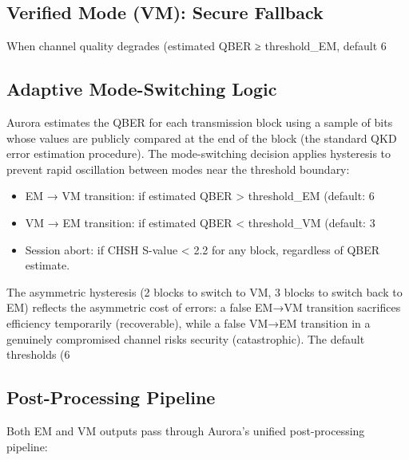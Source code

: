 \subsection{Verified Mode (VM): Secure Fallback}
When channel quality degrades (estimated QBER ≥ threshold_EM, default 6%

\subsection{Adaptive Mode-Switching Logic}
Aurora estimates the QBER for each transmission block using a sample of bits whose values are publicly compared at the end of the block (the standard QKD error estimation procedure). The mode-switching decision applies hysteresis to prevent rapid oscillation between modes near the threshold boundary:

\begin{itemize}
\item EM → VM transition: if estimated QBER > threshold_EM (default: 6%
\item VM → EM transition: if estimated QBER < threshold_VM (default: 3%
\item Session abort: if CHSH S-value < 2.2 for any block, regardless of QBER estimate.
\end{itemize}


The asymmetric hysteresis (2 blocks to switch to VM, 3 blocks to switch back to EM) reflects the asymmetric cost of errors: a false EM→VM transition sacrifices efficiency temporarily (recoverable), while a false VM→EM transition in a genuinely compromised channel risks security (catastrophic). The default thresholds (6%

\subsection{Post-Processing Pipeline}
Both EM and VM outputs pass through Aurora's unified post-processing pipeline:

